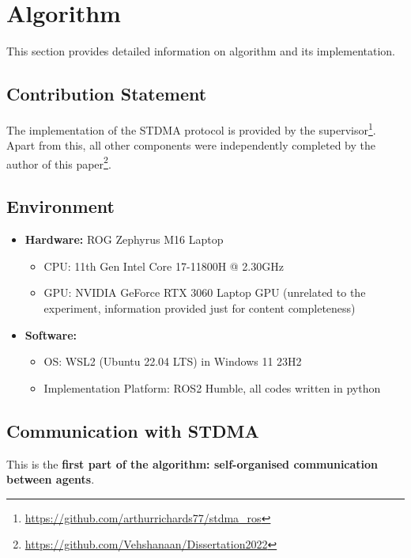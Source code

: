 \chapter{Algorithm}
\label{chap:Algorithm}

This section provides detailed information on algorithm and its implementation.

\section*{Contribution Statement}

The implementation of the STDMA protocol is provided by the supervisor\footnote{\url{https://github.com/arthurrichards77/stdma_ros}}. Apart from this, all other components were independently completed by the author of this paper\footnote{\url{https://github.com/Vehshanaan/Dissertation2022}}.

\section*{Environment}
\label{chap:environment}
\begin{itemize}
    \item \textbf{Hardware:} ROG Zephyrus M16 Laptop
    \begin{itemize}
        \item CPU: 11th Gen Intel Core 17-11800H @ 2.30GHz
        \item GPU: NVIDIA GeForce RTX 3060 Laptop GPU (unrelated to the experiment, information provided just for content completeness)
    \end{itemize}
    \item \textbf{Software:}
    \begin{itemize}
        \item OS: WSL2 (Ubuntu 22.04 LTS) in Windows 11 23H2
        \item Implementation Platform: ROS2 Humble, all codes written in python
    \end{itemize}
\end{itemize}

\section{Communication with STDMA}

This is the \textbf{first part of the algorithm: self-organised communication between agents}.

